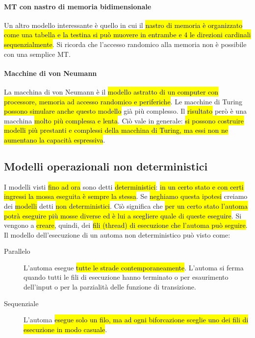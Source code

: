 \documentclass[a4paper,11pt,oneside]{article}
\theoremstyle{plain}
\theoremstyle{definition}
\theoremstyle{remark}
\begin{document}
\paragraph{MT con nastro di memoria bidimensionale} Un altro modello
interessante è quello in cui il \hl{nastro di memoria è organizzato come una
tabella e la testina si può muovere in entrambe e 4 le direzioni cardinali
sequenzialmente}. Si ricorda che l'accesso randomico alla memoria non è
possibile con una semplice MT\@.

\paragraph{Macchine di von Neumann} La macchina di von Neumann è il
\hl{modello astratto di un computer con processore, memoria ad accesso randomico
e periferiche}. Le macchine di Turing \hl{possono simulare anche questo modello}
già più complesso. Il \hl{risultato} però è una macchina \hl{molto più complessa
e lenta}. Ciò vale in generale: \hl{si possono costruire modelli più prestanti e
complessi della macchina di Turing, ma essi non ne aumentano la capacità
espressiva}.

\subsection{Modelli operazionali non deterministici}\label{sec:modelli-non-det}

I modelli visti \hl{fino ad ora} sono detti \hl{deterministici}: \hl{in un certo
stato e con certi ingressi la mossa eseguita è sempre la stessa}. Se
\hl{neghiamo questa ipotesi} creiamo dei \hl{modelli} detti \hl{non
deterministici}. Ciò significa che \hl{per un certo stato l'automa potrà
eseguire più mosse diverse ed è lui a scegliere quale di queste eseguire}. Si
vengono a \hl{creare}, quindi, dei \hl{fili (thread) di esecuzione che l'automa
può seguire}. Il modello dell'esecuzione di un automa non deterministico può
visto come:

\begin{description}
  \item[Parallelo] L'automa esegue \hl{tutte le strade contemporaneamente}.
    L'automa si ferma quando tutti le fili di esecuzione hanno terminato o per
    esaurimento dell'input o per la parzialità delle funzione di transizione.
  \item[Sequenziale] L'automa \hl{esegue solo un filo, ma ad ogni biforcazione
    sceglie uno dei fili di esecuzione in modo casuale}.
\end{description}
\end{document}
